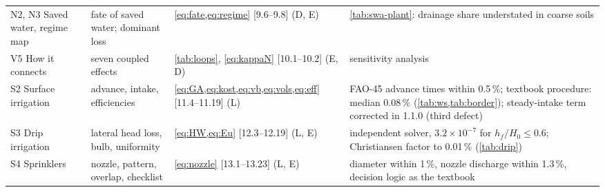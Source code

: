 {\begin{longtable}{>{\raggedright\arraybackslash}p{2.3cm}>{\raggedright\arraybackslash}p{3.3cm}>{\raggedright\arraybackslash}p{4.6cm}>{\raggedright\arraybackslash}p{4.0cm}}
N2, N3 Saved water, regime map & fate of saved water; dominant loss & \cref{eq:fate,eq:regime} [9.6--9.8] (D, E) & \cref{tab:swa-plant}: drainage share understated in coarse soils\\
V5 How it connects & seven coupled effects & \cref{tab:loops}, \cref{eq:kappaN} [10.1--10.2] (E, D) & sensitivity analysis\\
S2 Surface irrigation & advance, intake, efficiencies & \cref{eq:GA,eq:kost,eq:vb,eq:vols,eq:eff} [11.4--11.19] (L) & FAO-45 advance times within 0.5\,\%; textbook procedure: median 0.08\,\% (\cref{tab:ws,tab:border}); steady-intake term corrected in 1.1.0 (third defect)\\
S3 Drip irrigation & lateral head loss, bulb, uniformity & \cref{eq:HW,eq:Eu} [12.3--12.19] (L, E) & independent solver, $3.2\times10^{-7}$ for $h_f/H_0\le0.6$; Christiansen factor to 0.01\,\% (\cref{tab:drip})\\
S4 Sprinklers & nozzle, pattern, overlap, checklist & \cref{eq:nozzle} [13.1--13.23] (L, E) & diameter within 1\,\%, nozzle discharge within 1.3\,\%, decision logic as the textbook\\\bottomrule
\end{longtable}}
